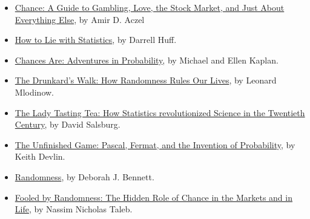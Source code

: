 \documentclass{article}
\begin{document}
\begin{itemize}
\item \href{http://www.amazon.com/Chance-Guide-Gambling-Market-Everything/dp/1560257946}{Chance:  A Guide to Gambling, Love, the Stock Market, and Just About Everything Else}, by Amir D. Aczel
\item \href{http://www.amazon.com/How-Lie-Statistics-Darrell-Huff/dp/0393310728/}{How to Lie with Statistics}, by Darrell Huff.
\item \href{http://www.amazon.com/Chances-Are-Probability-Michael-Kaplan/dp/0143038346/}{Chances Are:  Adventures in Probability}, by Michael and Ellen Kaplan.
\item \href{http://www.amazon.com/Drunkards-Walk-Randomness-Rules-Vintage/dp/0307275175}{The Drunkard’s Walk:  How Randomness Rules Our Lives}, by Leonard Mlodinow.
\item \href{http://www.amazon.com/Lady-Tasting-Tea-Statistics-Revolutionized/dp/0805071342}{The Lady Tasting Tea:  How Statistics revolutionized Science in the Twentieth Century}, by David Salsburg.
\item \href{https://www.goodreads.com/en/book/show/4443547-the-unfinished-game}{The Unfinished Game: Pascal, Fermat, and the Invention of Probability}, by Keith Devlin.
\item \href{https://www.goodreads.com/en/book/show/1445847.Randomness}{Randomness}, by Deborah J. Bennett.
\item \href{https://www.goodreads.com/book/show/38315.Fooled\_by\_Randomness?from\_search=true\&from\_srp=true\&qid=Djljw9C0Ni\&rank=1}{Fooled by Randomness: The Hidden Role of Chance in the Markets and in Life}, by Nassim Nicholas Taleb.
\end{itemize}


\end{document}
